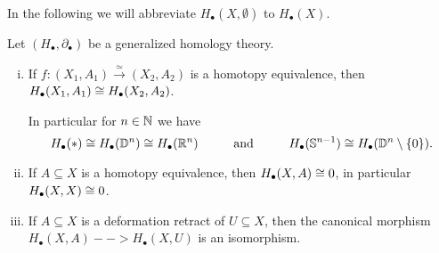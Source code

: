 	In the following we will abbreviate $H_\bullet(X,\emptyset)$ to $H_\bullet(X)$.

	\begin{lemma}
		Let $(H_\bullet, \partial_\bullet)$ be a generalized homology theory.
		\begin{enumerate}[(i)]
			\item{
				If $f:(X_1,A_1) \xrightarrow{\simeq} (X_2,A_2)$ is a homotopy equivalence, then $H_\bullet(X_1,A_1) \cong H_\bullet(X_2,A_2)$.

				In particular for $n \in \mathbb{N}$ we have
				\begin{equation*}
					H_\bullet(*) \cong H_\bullet(\mathbb{D}^n) \cong H_\bullet(\mathbb{R}^n) \hspace{1cm}\text{and}\hspace{1cm} H_\bullet(\mathbb{S}^{n-1}) \cong H_\bullet(\mathbb{D}^n \setminus \{0\}).
				\end{equation*}
			}
			\item{
				If $A \subseteq X$ is a homotopy equivalence, then $H_\bullet(X,A) \cong 0$, in particular $H_\bullet(X,X) \cong 0$.
			}
			\item{
				If $A \subseteq X$ is a deformation retract of $U \subseteq X$, then the canonical morphism $H_\bullet(X,A) --> H_\bullet(X,U)$ is an isomorphism.
			}
		\end{enumerate}
	\end{lemma}
